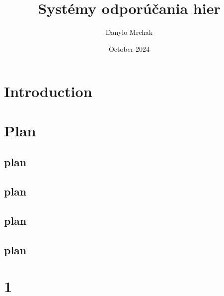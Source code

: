 \documentclass{article}
\title{Systémy odporúčania hier}
\author{Danylo Mrchak}
\date{October 2024}
\begin{document}
\maketitle

\section{Introduction}
\section{Plan}
\subsection{plan}
\subsection{plan}
\subsection{plan}
\subsection{plan}

\section{1}
\end{document}

